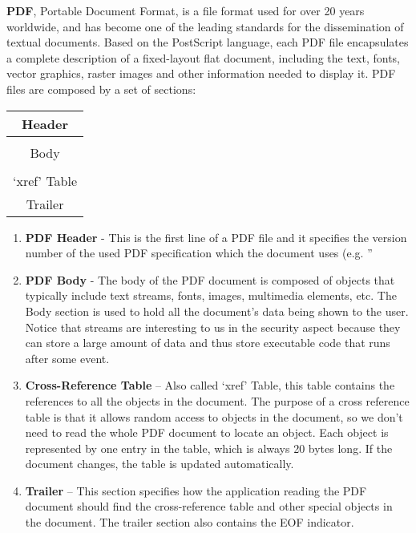 \documentclass{article}
\begin{document}
\indent \textbf{PDF}, Portable Document Format, is a file format used for over 20 years worldwide, and has become one of the leading standards for the dissemination of textual documents. Based on the PostScript language, each PDF file encapsulates a complete description of a fixed-layout flat document, including the text, fonts, vector graphics, raster images and other information needed to display it. PDF files are composed by a set of sections:


\begin{table}[htb]
\centering
\begin{tabular}[c]{|c|}
\hline
Header\\
\hline
\\
Body\\
\\
\hline
‘xref’ Table\\
\hline
Trailer\\
\hline
\end{tabular}
\end{table}

\newpage
\begin{enumerate}
	\item \textbf{PDF Header} - This is the first line of a PDF file and it specifies the version number of the used PDF specification which the document uses (e.g. ”%
	\item \textbf{PDF Body} - The body of the PDF document is composed of objects that typically include text streams, fonts, images, multimedia elements, etc. The Body section is used to hold all the document’s data being shown to the user.
Notice that streams are interesting to us in the security aspect because they can store a large amount of data and thus store executable code that runs after some event.
	\item \textbf{Cross-Reference Table} – Also called ‘xref’ Table, this table contains the references to all the objects in the document. The purpose of a cross reference table is that it allows random access to objects in the document, so we don’t need to read the whole PDF document to locate an object. Each object is represented by one entry in the table, which is always 20 bytes long. If the document changes, the table is updated automatically.
	\item \textbf{Trailer} – This section specifies how the application reading the PDF document should find the cross-reference table and other special objects in the document. The trailer section also contains the EOF indicator.
\end{enumerate}
\end{document}
